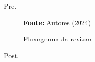 \documentclass[brazil,msc]{ppgpi-abntex2}
\newcommand{\fonte}[1]{\par\small\textbf{Fonte:} #1}
\begin{document}
Pre.
\begin{landscape}
\newbox\testbox
\savebox\testbox{}
\begin{figure}[H]
  \centering
  \caption{Fluxograma da revisao}
  \fonte{Autores (2024)}
\end{figure}
\end{landscape}
Post.
\end{document}
